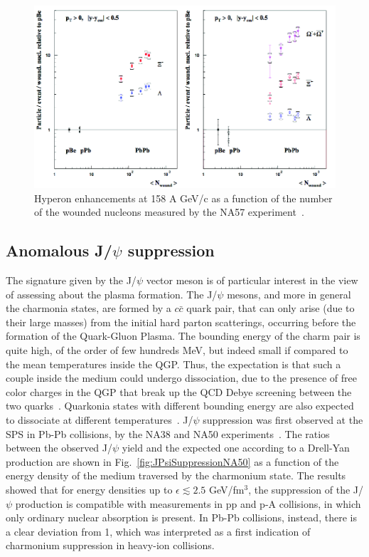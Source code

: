 \begin{figure}[!ht]
  \centering
  \includegraphics[width=12cm]{FigCap1/strangEnhancSPS.png}
  \caption{ Hyperon enhancements at 158 A GeV/c as a function of the number of the wounded nucleons measured by the NA57 experiment~\cite{Sandor:2004bg}.}
  \label{fig:sEnhancSPS}
\end{figure}

\subsection{Anomalous J/$\psi$ suppression}
\label{sec:JPsiSuppression}
The signature given by the J/$\psi$ vector meson is of particular interest
in the view of assessing about the plasma formation.
The J/$\psi$ mesons, and more in general the charmonia states, are formed by a $c\bar{c}$ quark pair, that can only arise (due to their large masses) from the initial hard parton scatterings, occurring before the formation of the Quark-Gluon Plasma. The bounding energy of the charm pair is quite high, of the order of few hundreds MeV, but indeed small if compared to the mean temperatures inside the QGP. Thus, the expectation is that such a couple inside the medium could undergo dissociation, due to the presence of free color charges in the QGP that break up the QCD Debye screening between the two quarks~\cite{Abreu:2000ni}. Quarkonia states with different bounding energy are also expected to dissociate at different temperatures~\cite{Digal:2001ue}.
J/$\psi$ suppression was first observed at the SPS in Pb-Pb collisions, by the NA38 and NA50 experiments~\cite{Abreu:2000ni}.
The ratios between the observed J/$\psi$ yield and the expected one according to a Drell-Yan production are shown in Fig.~\ref{fig:JPsiSuppressionNA50} as a function of the energy density of the medium traversed by the charmonium state. The results showed that for energy densities up to $\epsilon \lesssim 2.5$ GeV/fm$^3$, 
the suppression of the J/$\psi$ production is compatible with measurements in pp and p-A collisions, in which only ordinary nuclear absorption is present. In Pb-Pb collisions, instead, there is a clear deviation from 1, which was interpreted as a first indication of charmonium suppression in heavy-ion collisions.

